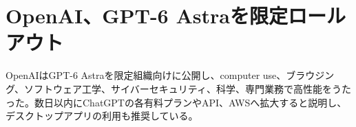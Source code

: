 \section{OpenAI、GPT-6 Astraを限定ロールアウト}

OpenAIはGPT-6 Astraを限定組織向けに公開し、computer use、ブラウジング、ソフトウェア工学、サイバーセキュリティ、科学、専門業務で高性能をうたった。数日以内にChatGPTの各有料プランやAPI、AWSへ拡大すると説明し、デスクトップアプリの利用も推奨している。


